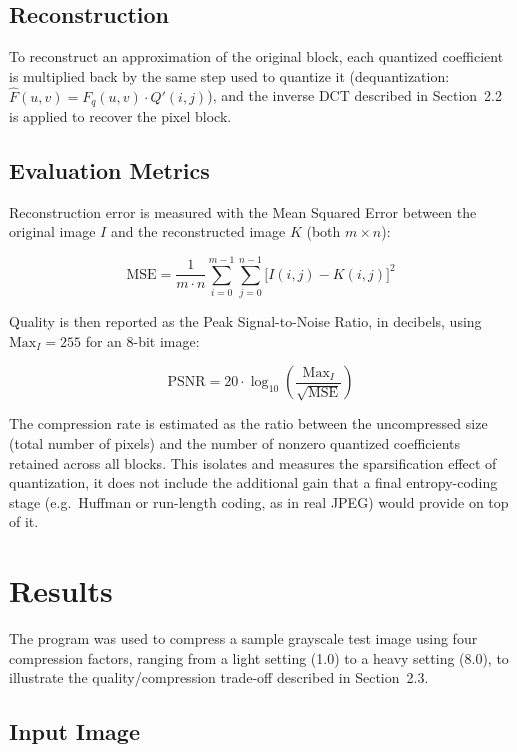 \documentclass[11pt,a4paper]{article}
\begin{document}
\subsection{Reconstruction}

To reconstruct an approximation of the original block, each quantized coefficient is multiplied back by the same step used to quantize it (dequantization: $\hat F(u,v) = F_q(u,v)\cdot Q'(i,j)$), and the inverse DCT described in Section~2.2 is applied to recover the pixel block.

\subsection{Evaluation Metrics}

Reconstruction error is measured with the Mean Squared Error between the original image $I$ and the reconstructed image $K$ (both $m \times n$):

\begin{equation}
\text{MSE} = \frac{1}{m \cdot n} \sum_{i=0}^{m-1}\sum_{j=0}^{n-1} \big[I(i,j) - K(i,j)\big]^2
\end{equation}

Quality is then reported as the Peak Signal-to-Noise Ratio, in decibels, using $\text{Max}_I = 255$ for an 8-bit image:

\begin{equation}
\text{PSNR} = 20 \cdot \log_{10}\!\left(\frac{\text{Max}_I}{\sqrt{\text{MSE}}}\right)
\end{equation}

The compression rate is estimated as the ratio between the uncompressed size (total number of pixels) and the number of nonzero quantized coefficients retained across all blocks. This isolates and measures the sparsification effect of quantization, it does not include the additional gain that a final entropy-coding stage (e.g.\ Huffman or run-length coding, as in real JPEG) would provide on top of it.

\section{Results}

The program was used to compress a sample grayscale test image using four compression factors, ranging from a light setting (1.0) to a heavy setting (8.0), to illustrate the quality/compression trade-off described in Section~2.3.

\subsection{Input Image}
\end{document}
